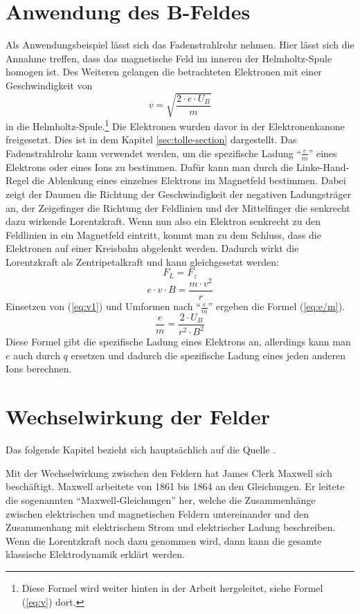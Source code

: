 \section{Anwendung des B-Feldes}
\label{sec:Fadenstrahlrohr}
Als Anwendungsbeispiel lässt sich das Fadenstrahlrohr nehmen.
Hier lässt sich die Annahme treffen, dass das magnetische Feld im inneren der Helmholtz-Spule homogen ist. Des Weiteren gelangen die betrachteten Elektronen mit einer Geschwindigkeit von 
\begin{equation}
\label{eq:v1}
    v=\sqrt{\frac{2 \cdot e \cdot U_B}{m}}
\end{equation}
in die Helmholtz-Spule.\footnote{Diese Formel wird weiter hinten in der Arbeit hergeleitet, siehe Formel (\ref{eq:v}) dort.}
Die Elektronen wurden davor in der Elektronenkanone freigesetzt.
Dies ist in dem Kapitel \ref{sec:tolle-section} dargestellt. 
Das Fadenstrahlrohr kann verwendet werden, um die spezifische Ladung "`$\frac{e}{m}$"' eines Elektrons oder eines Ions zu bestimmen.
Dafür kann man durch die Linke-Hand-Regel die Ablenkung eines einzelnes Elektrons im Magnetfeld bestimmen.
Dabei zeigt der Daumen die Richtung der Geschwindigkeit der negativen Ladungsträger an, der Zeigefinger die Richtung der Feldlinien und der Mittelfinger die senkrecht dazu wirkende Lorentzkraft.
Wenn nun also ein Elektron senkrecht zu den Feldlinien in ein Magnetfeld eintritt, kommt man zu dem Schluss, dass die Elektronen auf einer Kreisbahn abgelenkt werden. 
Dadurch wirkt die Lorentzkraft als Zentripetalkraft und kann gleichgesetzt werden:
$$F_L = F_z$$
$$e \cdot v \cdot B = \frac{m \cdot v^2}{r}$$
Einsetzen von (\ref{eq:v1}) und  Umformen nach "`$\frac{e}{m}$"' ergeben die Formel (\ref{eq:e/m}).
\begin{equation}
\label{eq:e/m}
    \frac{e}{m} = \frac{2 \cdot U_B}{ r^2 \cdot B^2}
\end{equation}
Diese Formel gibt die spezifische Ladung eines Elektrons an, allerdings kann man $e$ auch durch $q$ ersetzen und dadurch die spezifische Ladung eines jeden anderen Ions berechnen.
\section{Wechselwirkung der Felder}%
\label{sec:Maxwell}
Das folgende Kapitel bezieht sich hauptsächlich auf die Quelle \cite{Maxwell}.

Mit der Wechselwirkung zwischen den Feldern hat James Clerk Maxwell sich
beschäftigt.
Maxwell arbeitete von 1861 bis 1864 an den Gleichungen.
Er leitete die sogenannten "`Maxwell-Gleichungen"' her, welche die Zusammenhänge zwischen elektrischen und magnetischen Feldern untereinander und den Zusammenhang mit elektrischem Strom und elektrischer Ladung beschreiben.
Wenn die Lorentzkraft noch dazu genommen wird, dann kann die gesamte klassische Elektrodynamik erklärt werden.

